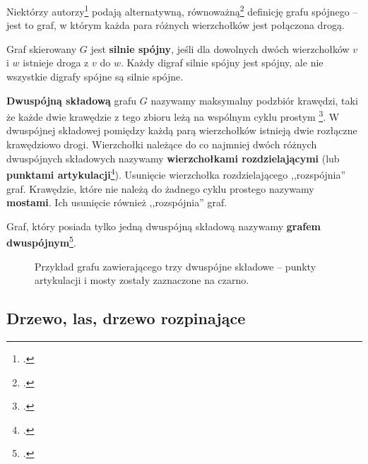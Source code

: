 Niektórzy autorzy\footcite[342]{ross} podają alternatywną, równoważną\footcite[42]{wilson} definicję grafu spójnego -- jest to graf, w którym każda para różnych wierzchołków jest połączona drogą. 

Graf skierowany $G$ jest \textbf{silnie spójny}, jeśli dla dowolnych dwóch wierzchołków $v$ i $w$ istnieje droga z $v$ do $w$. Każdy digraf silnie spójny jest spójny, ale nie wszystkie digrafy spójne są silnie spójne. 

\textbf{Dwuspójną składową} grafu $G$ nazywamy maksymalny podzbiór krawędzi, taki że każde dwie krawędzie z tego zbioru leżą na wspólnym cyklu prostym \footcite[634]{cormen}. W dwuspójnej składowej pomiędzy każdą parą wierzchołków istnieją dwie rozłączne krawędziowo drogi. Wierzchołki należące do co najmniej dwóch różnych dwuspójnych składowych nazywamy \textbf{wierzchołkami rozdzielającymi} (lub \textbf{punktami artykulacji}\footcite[633]{cormen}). Usunięcie wierzchołka rozdzielającego ,,rozspójnia'' graf. Krawędzie, które nie należą do żadnego cyklu prostego nazywamy \textbf{mostami}. Ich usunięcie również ,,rozspójnia'' graf.

Graf, który posiada tylko jedną dwuspójną składową nazywamy \textbf{grafem dwuspójnym}\footcite[232]{banachowski}.

\begin{figure}[H]
\centering
{}
\captionsetup{justification=centering}
\caption{Przykład grafu zawierającego trzy dwuspójne składowe -- punkty artykulacji i mosty zostały zaznaczone na czarno.} \label{fig:biconnected-copoments-example}
\end{figure}

\subsection*{Drzewo, las, drzewo rozpinające}

